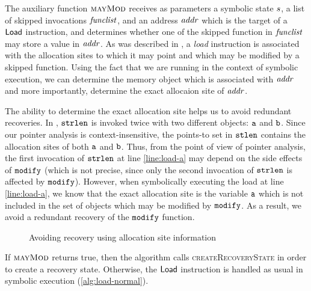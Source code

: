 The auxiliary function $\textsc{mayMod}$
receives as parameters a symbolic state $s$, a list of
skipped invocations $\mathit{funclist}$, and an address $\mathit{addr}$ which is the
target of a $\mathsf{Load}$ instruction, and determines whether one
of the skipped function in $\mathit{funclist}$ may store a value in $\mathit{addr}$.
As was described in ,
a \textit{load} instruction is associated with the allocation sites to
which it may point and which may be modified by a skipped function.
Using the fact that we are running in the context of symbolic execution,
we can determine the memory object which is associated with $\mathit{addr}$ and more importantly,
determine the exact allocaion site of $\mathit{addr}$.

The ability to determine the exact allocation site helps us to avoid redundant recoveries.
In , $\texttt{strlen}$ is invoked twice
with two different objects: $\texttt{a}$ and $\texttt{b}$.
Since our pointer analysis is context-insensitive,
the points-to set in $\texttt{stlen}$ contains the allocation sites of both $\texttt{a}$ and $\texttt{b}$.
Thus, from the point of view of pointer analysis,
the first invocation of $\texttt{strlen}$ at line \ref{line:load-a}
may depend on the side effects of $\texttt{modify}$
(which is not precise, since only the second invocation of $\texttt{strlen}$ is affected by $\texttt{modify}$).
However, when symbolically executing the load at line \ref{line:load-a},
we know that the exact allocation site is the variable $\texttt{a}$
which is not included in the set of objects which may be modified by $\texttt{modify}$.
As a result, we avoid a redundant recovery of the $\texttt{modify}$ function.

\begin{figure*}[t]
  \centering
  \subfloat[]{
    
    \label{fig:dependent-load}
  }
  \caption{Avoiding recovery using allocation site information}
  \label{fig:simpe-dependent-load}
\end{figure*}

If $\textsc{mayMod}$ returns true,
then the algorithm calls \textsc{createRecoveryState} in order to create a recovery state.
Otherwise, the $\mathsf{Load}$ instruction is handled as usual in symbolic execution (\cref{alg:load-normal}).

